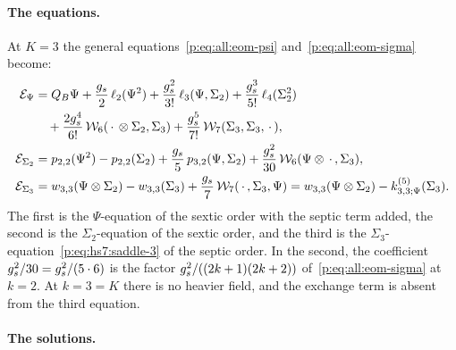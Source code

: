 \paragraph{The equations.}

At $K = 3$ the general equations~\eqref{p:eq:all:eom-psi} and~\eqref{p:eq:all:eom-sigma} become:
\begin{subequations}
  \label{ch3:eq:eom-K3}
  \begin{align}
    \label{ch3:eq:eom-K3-psi}
    \mathcal E_\Psi
      &
      = Q_B \Psi
        + \frac{\gs}{2} \, \ell_2(\Psi^2)
        + \frac{\gs^2}{3!} \, \ell_3(\Psi, \Sigma_2)
        + \frac{\gs^3}{5!} \, \ell_4(\Sigma_2^2)
      \notag
      \\ &
      \quad
        + \frac{2 \gs^4}{6!} \, \dvertex{6}(\, \cdot \, \otimes \Sigma_2, \Sigma_3)
        + \frac{\gs^5}{7!} \, \dvertex{7}(\Sigma_3, \Sigma_3, \, \cdot \,),
    \\
    \label{ch3:eq:eom-K3-sigma2}
    \mathcal E_{\Sigma_2}
      &
      = \sprod{2}{2}(\Psi^2)
        - \sprod{2}{2}(\Sigma_2)
        + \frac{\gs}{5} \, \sprod{3}{2}(\Psi, \Sigma_2)
        + \frac{\gs^2}{30} \, \dvertex{6}(\Psi \otimes \, \cdot \,, \Sigma_3),
    \\
    \label{ch3:eq:eom-K3-sigma3}
    \mathcal E_{\Sigma_3}
      &
      = \wprod{3}{3}(\Psi \otimes \Sigma_2)
        - \wprod{3}{3}(\Sigma_3)
        + \frac{\gs}{7} \, \dvertex{7}(\, \cdot \,, \Sigma_3, \Psi)
      = \wprod{3}{3}(\Psi \otimes \Sigma_2)
        - \kin{3}{\Psi}{5}(\Sigma_3).
  \end{align}
\end{subequations}
The first is the $\Psi$-equation of the sextic order with the septic term added, the second is the $\Sigma_2$-equation of the sextic order, and the third is the $\Sigma_3$-equation~\eqref{p:eq:hs7:saddle-3} of the septic order.
In the second, the coefficient $g_s^2 / 30 = g_s^2 / (5 \cdot 6)$ is the factor $g_s^2 / ((2 k + 1) (2 k + 2))$ of~\eqref{p:eq:all:eom-sigma} at $k = 2$.
At $k = 3 = K$ there is no heavier field, and the exchange term is absent from the third equation.

\paragraph{The solutions.}

